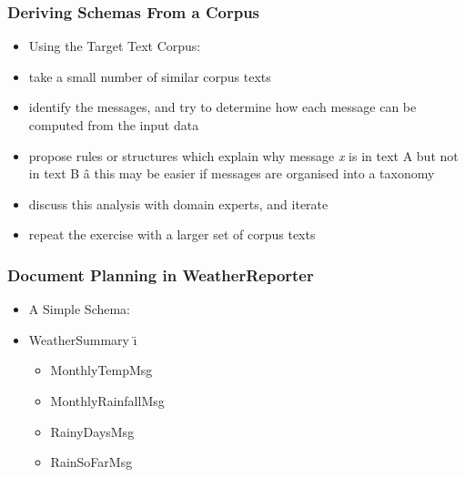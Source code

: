 \documentclass[compress,color=usenames]{beamer}
\begin{document}
\begin{frame}
\frametitle{Deriving Schemas 
From a Corpus}

\label{f140}
\begin{itemize}
\item { {Using the Target Text Corpus:}}
\item { {take a small number of similar corpus texts}}
\item { {identify the messages, and try to determine how each message can be computed from the input data}}
\item { {propose rules or structures which explain why message \textit{x} is in text A but not in text B \^a this may be easier if messages are organised into a taxonomy}}
\item { {discuss this analysis with domain experts, and iterate}}
\item { {repeat the exercise with a larger set of corpus texts}}
\end{itemize}

\end{frame}

\begin{frame}
\frametitle{Document Planning in WeatherReporter}

\label{f142}
\begin{itemize}
\item { {A Simple Schema:}}

\item { {WeatherSummary \"{\i}{{}}}}
\begin{itemize}
\item MonthlyTempMsg
\item MonthlyRainfallMsg
\item RainyDaysMsg
\item RainSoFarMsg
\end{itemize}
\end{itemize}

 \end{frame}
\end{document}
